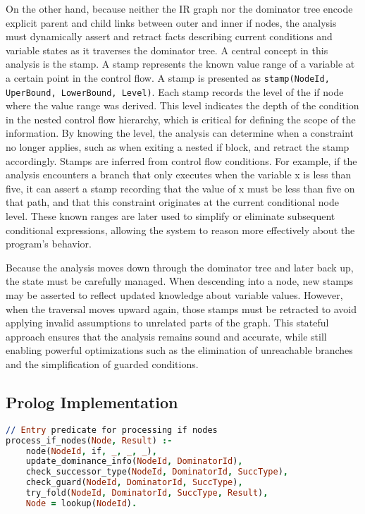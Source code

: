 On the other hand, because neither the IR graph nor the dominator tree encode explicit parent and child links between outer and inner if nodes, the analysis must dynamically assert and retract facts describing current conditions and variable states as it traverses the dominator tree. A central concept in this analysis is the stamp. A stamp represents the known value range of a variable at a certain point in the control flow. A stamp is presented as \texttt{stamp(NodeId, UperBound, LowerBound, Level)}. Each stamp records the level of the if node where the value range was derived. This level indicates the depth of the condition in the nested control flow hierarchy, which is critical for defining the scope of the information. By knowing the level, the analysis can determine when a constraint no longer applies, such as when exiting a nested if block, and retract the stamp accordingly. Stamps are inferred from control flow conditions. For example, if the analysis encounters a branch that only executes when the variable x is less than five, it can assert a stamp recording that the value of x must be less than five on that path, and that this constraint originates at the current conditional node level. These known ranges are later used to simplify or eliminate subsequent conditional expressions, allowing the system to reason more effectively about the program’s behavior.

Because the analysis moves down through the dominator tree and later back up, the state must be carefully managed. When descending into a node, new stamps may be asserted to reflect updated knowledge about variable values. However, when the traversal moves upward again, those stamps must be retracted to avoid applying invalid assumptions to unrelated parts of the graph. This stateful approach ensures that the analysis remains sound and accurate, while still enabling powerful optimizations such as the elimination of unreachable branches and the simplification of guarded conditions.

\subsection*{Prolog Implementation}
\begin{lstlisting}[language=Prolog]
// Entry predicate for processing if nodes
process_if_nodes(Node, Result) :-
    node(NodeId, if, _, _, _),
    update_dominance_info(NodeId, DominatorId),
    check_successor_type(NodeId, DominatorId, SuccType),
    check_guard(NodeId, DominatorId, SuccType),
    try_fold(NodeId, DominatorId, SuccType, Result),
    Node = lookup(NodeId).
\end{lstlisting}

